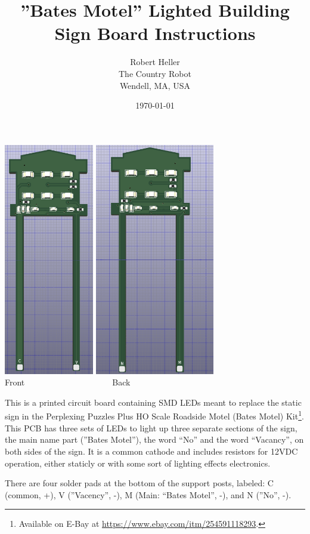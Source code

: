 \documentclass[12pt,twoside]{article}
\title{''Bates Motel'' Lighted Building Sign Board Instructions}
\author{Robert Heller \\ The Country Robot \\ Wendell, MA, USA}
\date{\today}
\begin{document}
\maketitle

\begin{centering}%
\includegraphics[height=4in]{BatesMotelFrontPCB.png}%
\includegraphics[height=4in]{BatesMotelBackPCB.png}\\
{\Large Front~~~~~~~~~~~~~~~~~~~~~Back}\\
\end{centering}

This is a printed circuit board containing SMD LEDs meant to replace the
static sign in the Perplexing Puzzles Plus HO Scale Roadside Motel (Bates
Motel) Kit\footnote{Available on E-Bay at
\url{https://www.ebay.com/itm/254591118293}.}. This PCB has three sets of LEDs
to light up three separate sections of the sign, the main name part (''Bates
Motel''), the word ``No'' and the word ``Vacancy'', on both sides of the sign.
It is a common cathode and includes resistors for 12VDC operation, either
staticly or with some sort of lighting effects electronics.

There are four solder pads at the bottom of the support posts, labeled: C
(common, +), V (''Vacency'', -), M (Main: ``Bates Motel'', -), and N (''No'',
-).
\end{document}
